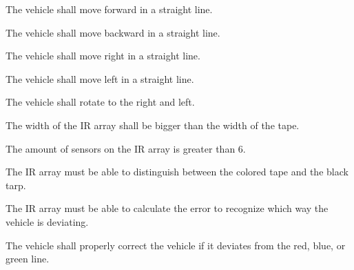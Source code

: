 \documentclass[11pt]{report}
\begin{document}
\label{sc:drive-train-and-steering-system}
\begin{greylineformat}
\vspace{-1.6em}
\label{sub:move-forward}
The vehicle shall move forward in a straight line.

\label{sub:move-backward}
The vehicle shall move backward in a straight line.

\label{sub:move-right}
The vehicle shall move right in a straight line.

\label{sub:move-left}
The vehicle shall move left in a straight line.

\label{sub:rotational-movement}
The vehicle shall rotate to the right and left.

\end{greylineformat}\label{sc:sensor-requirement-ir-sensor-array}
\begin{greylineformat}
\vspace{-1.6em}
\label{sub:width-of-the-ir-sensors}
The width of the \gls{IR} array shall be bigger than the width of the tape.

\label{sub:the-number-of-sensors-is-greater-than-6}
The amount of sensors on the \gls{IR} array is greater than 6.

\label{sub:it-must-detect-and-distinguish-the-tape-and-tarp}
The \gls{IR} array must be able to distinguish between the colored tape and the black tarp.

\label{sub:it-must-be-able-to-calculate-error}
The \gls{IR} array must be able to calculate the error to recognize which way the vehicle is deviating.

\label{sub:deviation-adjustment}
The vehicle shall properly correct the vehicle if it deviates from the red, blue, or green line.

\end{greylineformat}\label{sc:task-2-completion-times-obstacle-course}
\end{document}
